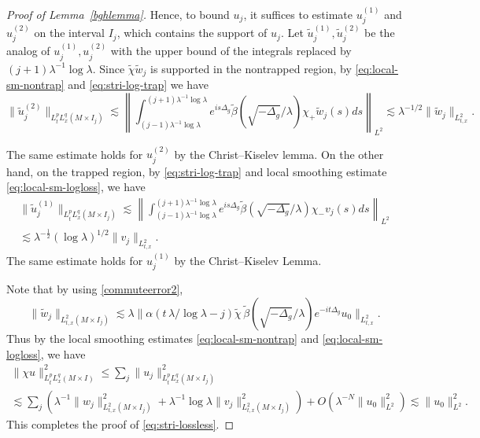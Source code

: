 \documentclass[10pt]{amsart}
\newcommand{\la}{\lambda}
\newcommand{\1}{{\bf 1}}
\begin{document}
\begin{proof}[Proof of Lemma~\ref{bghlemma}]
Hence, to bound $u_j$, it suffices to estimate 
$u_j^{(1)}$
and $u_j^{(2)}$ 
on the interval $I_j$,  which contains the support of $u_j$.
 Let $\tilde{u}_j^{(1)}, \tilde{u}_j^{(2)}$ be the analog of 
${u}_j^{(1)}, {u}_j^{(2)}$ with the upper bound of the integrals replaced by $(j+1)\la^{-1}\log\la$. 
    Since $\tilde \chi \tilde w_j$ is supported in the nontrapped region, by \eqref{eq:local-sm-nontrap} and \eqref{eq:stri-log-trap} we have
    \begin{equation*}
        \|\tilde{u}_j^{(2)}\|_{L_t^p L_x^q(M\times I_j)}\lesssim \left\|\int_{(j-1)\la^{-1}\log\la}^{(j+1)\la^{-1}\log\la}e^{is\Delta_g}\tilde\beta(\sqrt{-\Delta_g}/\la)\chi_+\tilde w_j(s)ds\right\|_{L^2}\lesssim \la^{-1/2}\|\tilde w_j\|_{L^2_{t,x}}.
    \end{equation*}


    The same estimate holds for $u_j^{(2)}$ by the Christ--Kiselev lemma. On the other hand, on the trapped region, by \eqref{eq:stri-log-trap} and local smoothing estimate \eqref{eq:local-sm-logloss}, we have
    \begin{multline*}
        \|\tilde u_j^{(1)}\|_{L_t^pL_x^q(M\times I_j)}\lesssim \left\|\int_{(j-1)\la^{-1}\log\la}^{(j+1)\la^{-1}\log\la}e^{is \Delta_g}\tilde\beta(\sqrt{-\Delta_g}/\la)\chi_-v_j(s) ds\right\|_{L^2}\\\lesssim \la^{-\frac12}(\log \la)^{1/2}\|v_j\|_{L^2_{t,x}}.
    \end{multline*}
    The same estimate holds for $u_j^{(1)}$ by the Christ--Kiselev Lemma.


    Note that by using \eqref{commuteerror2},
    $$\|\tilde w_j\|_{L^2_{t,x}(M\times I_j)} \lesssim \la\|\alpha(t\,\la /\log \la-j)\tilde\chi \,\tilde\beta(\sqrt{-\Delta_g}/\la)e^{-it\Delta_g}u_0\|_{L^2_{t,x}}.
    $$
    Thus by the local smoothing estimates \eqref{eq:local-sm-nontrap} and \eqref{eq:local-sm-logloss}, we have
    \begin{multline*}
    \|\chi u\|_{L_t^pL_x^q(M\times I)}^{2}\le  \sum_j \|u_j\|_{L_t^pL_x^q(M\times I_j)}^2\\\lesssim \sum_j \left(\la^{-1}\|w_j\|_{L^2_{t,x}(M\times I_j)}^2+\la^{-1}\log \la\|v_j\|_{L^2_{t,x}(M\times I_j)}^2\right)+O(\la^{-N}\|u_0\|_{L^2}^2)\lesssim \|u_0\|_{L^2}^2.
    \end{multline*}
    This completes the proof of \eqref{eq:stri-lossless}.
\end{proof}
\end{document}
